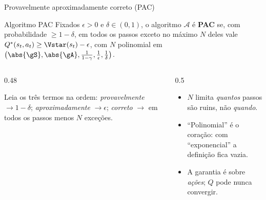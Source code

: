 \documentclass[aspectratio=169, 11pt]{beamer}
\newcommand{\Qstar}{Q^{*}}
\begin{document}
\begin{frame}{Provavelmente aproximadamente correto (PAC)}
  \begin{defbox}{Algoritmo PAC}
    Fixados $\epsilon > 0$ e $\delta \in (0,1)$, o algoritmo $\mathcal{A}$ é \textbf{PAC}
    se, com probabilidade $\ge 1-\delta$, em todos os passos exceto no máximo $N$ deles
    vale $\Qstar(s_t,a_t) \ge \Vstar(s_t) - \epsilon$, com $N$ \alert{polinomial} em
    $\bigl(\abs{\gS}, \abs{\gA}, \tfrac{1}{1-\gamma}, \tfrac{1}{\epsilon}, \tfrac{1}{\delta}\bigr)$.
  \end{defbox}
  \begin{columns}[T]
    \begin{column}{0.48\textwidth}
      \begin{ideiabox}
        Leia os três termos na ordem: \emph{provavelmente} $\to 1-\delta$;
        \emph{aproximadamente} $\to \epsilon$; \emph{correto} $\to$ em todos os passos
        menos $N$ exceções.
      \end{ideiabox}
    \end{column}
    \begin{column}{0.5\textwidth}
      \begin{alertabox}
        \begin{itemize}
          \item $N$ limita \emph{quantos} passos são ruins, não \emph{quando}.
          \item ``Polinomial'' é o coração: com ``exponencial'' a definição fica vazia.
          \item A garantia é sobre \emph{ações}; $Q$ pode nunca convergir.
        \end{itemize}
      \end{alertabox}
    \end{column}
  \end{columns}
\end{frame}
\end{document}
